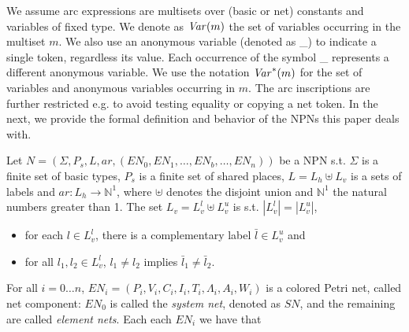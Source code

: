 \documentclass{llncs}
\begin{document}
We assume arc expressions are multisets over (basic or net) constants and variables of fixed type. We denote as ${\it Var}(m)$ the set of variables occurring in the multiset $m$. We also use an anonymous variable (denoted as \_) to indicate a single token, regardless its value. Each occurrence of the symbol \_ represents a different anonymous variable. We use the notation ${\it Var}^*(m)$ for the set of variables and anonymous variables occurring in $m$. The arc inscriptions are further restricted e.g. to avoid testing equality or copying a net token. In the next, we provide  the formal definition and behavior of the NPNs this paper deals with.


\begin{definition}
\label{def:npn}
Let $N= (\Sigma, P_s, L, ar, (EN_0, EN_1,\ldots,EN_b,\ldots, EN_n))$ be a NPN s.t. $\Sigma$ is a finite set of basic types, $P_s$ is a finite set of shared places, $L = L_h\uplus L_v$ is  a sets of labels and $ar: L_h\to \mathbb{N}^{1}$, where $\uplus$ denotes the disjoint union and $\mathbb{N}^{1}$ the natural numbers greater than 1. The set $L_v = L_v^l\uplus L_v^u$ is s.t. $|L_v^l|=|L_v^u|$,


\begin{itemize}
    \item for each $l\in L_v^l$, there is a complementary label $\bar{l}\in L_v^u$ and
    \item for all $l_1,l_2\in L_v^l$, $l_1\neq l_2$ implies $\bar{l}_1\neq \bar{l}_2$.
\end{itemize}

\noindent For all $i=0\ldots n$, $EN_i=(P_i, V_i, C_i, I_i, T_i, \Lambda_i, A_i, W_i)$ is a colored Petri net, called net component: $EN_0$ is called the \emph{system net}, denoted as $SN$, and the remaining are called\emph{ element nets}. Each each $EN_i$ we have that


\end{definition}
\end{document}
